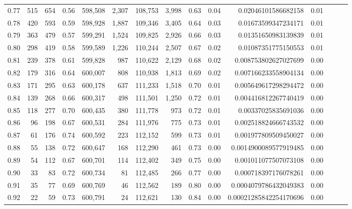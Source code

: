 \begin{tabular}{rrrrrrrrrrrrrrr}
0.77 &     515 &    654 &  0.56 &  598,508 &    2,307 &  108,753 &    3,998 &  0.63 &  0.04 &     0.02046101586682158 &      0.01 \\
0.78 &     420 &    593 &  0.59 &  598,928 &    1,887 &  109,346 &    3,405 &  0.64 &  0.03 &     0.01673599347234171 &      0.01 \\
0.79 &     363 &    479 &  0.57 &  599,291 &    1,524 &  109,825 &    2,926 &  0.66 &  0.03 &     0.01351650983139839 &      0.01 \\
0.80 &     298 &    419 &  0.58 &  599,589 &    1,226 &  110,244 &    2,507 &  0.67 &  0.02 &     0.01087351775150553 &      0.01 \\
0.81 &     239 &    378 &  0.61 &  599,828 &      987 &  110,622 &    2,129 &  0.68 &  0.02 &    0.008753802627027699 &      0.00 \\
0.82 &     179 &    316 &  0.64 &  600,007 &      808 &  110,938 &    1,813 &  0.69 &  0.02 &    0.007166233558904134 &      0.00 \\
0.83 &     171 &    295 &  0.63 &  600,178 &      637 &  111,233 &    1,518 &  0.70 &  0.01 &    0.005649617298294472 &      0.00 \\
0.84 &     139 &    268 &  0.66 &  600,317 &      498 &  111,501 &    1,250 &  0.72 &  0.01 &    0.004416812267740419 &      0.00 \\
0.85 &     118 &    277 &  0.70 &  600,435 &      380 &  111,778 &      973 &  0.72 &  0.01 &     0.00337025835691036 &      0.00 \\
0.86 &      96 &    198 &  0.67 &  600,531 &      284 &  111,976 &      775 &  0.73 &  0.01 &    0.002518824666743532 &      0.00 \\
0.87 &      61 &    176 &  0.74 &  600,592 &      223 &  112,152 &      599 &  0.73 &  0.01 &    0.001977809509450027 &      0.00 \\
0.88 &      55 &    138 &  0.72 &  600,647 &      168 &  112,290 &      461 &  0.73 &  0.00 &   0.0014900089577919485 &      0.00 \\
0.89 &      54 &    112 &  0.67 &  600,701 &      114 &  112,402 &      349 &  0.75 &  0.00 &    0.001011077507073108 &      0.00 \\
0.90 &      33 &     83 &  0.72 &  600,734 &       81 &  112,485 &      266 &  0.77 &  0.00 &    0.000718397176078261 &      0.00 \\
0.91 &      35 &     77 &  0.69 &  600,769 &       46 &  112,562 &      189 &  0.80 &  0.00 &   0.0004079786432049383 &      0.00 \\
0.92 &      22 &     59 &  0.73 &  600,791 &       24 &  112,621 &      130 &  0.84 &  0.00 &  0.00021285842254170696 &      0.00 \\

\end{tabular}
